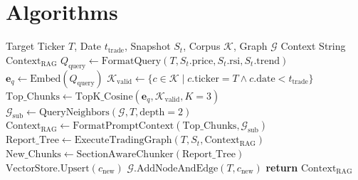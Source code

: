 \documentclass[conference]{IEEEtran}
\begin{document}
\section{Algorithms}

\begin{algorithm}[H]
\caption{Pre-LLM Hybrid RAG Retrieval and Ingestion}
\begin{algorithmic}[1]
\REQUIRE Target Ticker $T$, Date $t_{\text{trade}}$, Snapshot $S_t$, Corpus $\mathcal{K}$, Graph $\mathcal{G}$
\ENSURE Context String $\text{Context}_{\text{RAG}}$
\STATE $Q_{\text{query}} \leftarrow \text{FormatQuery}(T, S_t.\text{price}, S_t.\text{rsi}, S_t.\text{trend})$
\STATE $\mathbf{e}_q \leftarrow \text{Embed}(Q_{\text{query}})$
\STATE $\mathcal{K}_{\text{valid}} \leftarrow \{ c \in \mathcal{K} \mid c.\text{ticker} = T \land c.\text{date} < t_{\text{trade}} \}$
\STATE $\text{Top\_Chunks} \leftarrow \text{TopK\_Cosine}(\mathbf{e}_q, \mathcal{K}_{\text{valid}}, K=3)$
\STATE $\mathcal{G}_{\text{sub}} \leftarrow \text{QueryNeighbors}(\mathcal{G}, T, \text{depth}=2)$
\STATE $\text{Context}_{\text{RAG}} \leftarrow \text{FormatPromptContext}(\text{Top\_Chunks}, \mathcal{G}_{\text{sub}})$
\STATE $\text{Report\_Tree} \leftarrow \text{ExecuteTradingGraph}(T, S_t, \text{Context}_{\text{RAG}})$
\STATE $\text{New\_Chunks} \leftarrow \text{SectionAwareChunker}(\text{Report\_Tree})$
    \STATE $\text{VectorStore.Upsert}(c_{\text{new}})$
    \STATE $\mathcal{G}.\text{AddNodeAndEdge}(T, c_{\text{new}})$
\ENDFOR
\STATE \textbf{return} $\text{Context}_{\text{RAG}}$
\end{algorithmic}
\end{algorithm}
\end{document}
